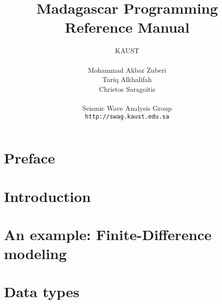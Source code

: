 %
%


\title{Madagascar Programming Reference Manual}
\author{KAUST\\
               \\
               Mohammad Akbar Zuberi\\
               Tariq Alkhalifah\\
               Christos Saragoitis\\
               \\
               Seismic Wave Analysis Group\\
               \texttt{http://swag.kaust.edu.sa}\\}
\date{}   






\maketitle
\cleardoublepage

\tableofcontents{}
\cleardoublepage

\chapter*{Preface}


\chapter{Introduction}


\chapter{An example: Finite-Difference modeling}



\chapter{Data types}\label{sec:datatypes}
  

